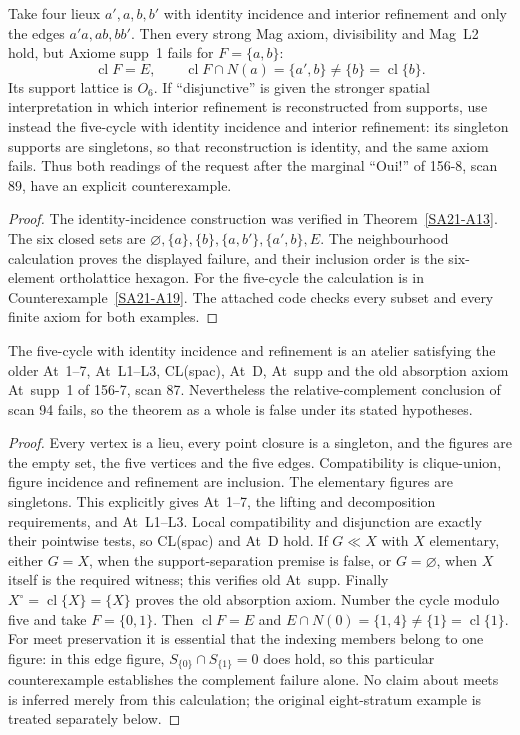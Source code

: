 \begin{counterexample}
\label{SA21-A18}
Take four lieux $a',a,b,b'$ with identity incidence and interior
refinement and only the edges $a'a,ab,bb'$.
Then every strong Mag axiom, divisibility and Mag~L2 hold, but
Axiome supp~1 fails for $F=\{a,b\}$:
\[
 \operatorname{cl}F=E,\qquad
 \operatorname{cl}F\cap N(a)=\{a',b\}\ne\{b\}
     =\operatorname{cl}\{b\}.
\]
Its support lattice is $O_6$. If ``disjunctive'' is given the stronger
spatial interpretation in which interior refinement is reconstructed
from supports, use instead the five-cycle with identity incidence
and interior refinement: its singleton supports are singletons, so
that reconstruction is identity, and the same axiom fails. Thus
both readings of the request after the marginal ``Oui!'' of 156-8,
scan 89, have an explicit counterexample.
\end{counterexample}
\begin{proof}
The identity-incidence construction was verified in
Theorem~\ref{SA21-A13}. The six closed sets are
$\varnothing,\{a\},\{b\},\{a,b'\},\{a',b\},E$.
The neighbourhood calculation proves the displayed failure, and
their inclusion order is the six-element ortholattice hexagon.
For the five-cycle the calculation is in
Counterexample~\ref{SA21-A19}. The attached code checks every subset
and every finite axiom for both examples.
\end{proof}

\begin{counterexample}
\label{SA21-A19}
The five-cycle with identity incidence and refinement is an atelier
satisfying the older At~1--7, At~L1--L3, CL(spac), At~D, At~supp and
the old absorption axiom At~supp~1 of 156-7, scan 87. Nevertheless
the relative-complement conclusion of scan 94 fails, so the theorem
as a whole is false under its stated hypotheses.
\end{counterexample}
\begin{proof}
Every vertex is a lieu, every point closure is a singleton, and the
figures are the empty set, the five vertices and the five edges.
Compatibility is clique-union, figure incidence and refinement are
inclusion. The elementary figures are singletons. This explicitly
gives At~1--7, the lifting and decomposition requirements, and
At~L1--L3. Local compatibility and disjunction are exactly their
pointwise tests, so CL(spac) and At~D hold. If $G\ll X$ with $X$
elementary, either $G=X$, when the support-separation premise is
false, or $G=\varnothing$, when $X$ itself is the required witness;
this verifies old At~supp. Finally $X^\circ=\operatorname{cl}\{X\}
=\{X\}$ proves the old absorption axiom.
Number the cycle modulo five and take $F=\{0,1\}$. Then
$\operatorname{cl}F=E$ and
$E\cap N(0)=\{1,4\}\ne\{1\}=\operatorname{cl}\{1\}$.
For meet preservation it is essential that the indexing members
belong to one figure: in this edge figure,
$S_{\{0\}}\cap S_{\{1\}}=0$ does hold, so this particular
counterexample establishes the complement failure alone. No claim
about meets is inferred merely from this calculation; the original
eight-stratum example is treated separately below.
\end{proof}

